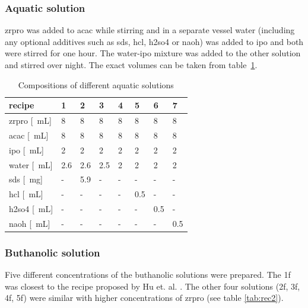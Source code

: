 \documentclass[a4paper]{article}
\newcommand{\td}[1]{\textbf{\textcolor{red}{#1}}}
\newcommand{\me}[1]{\textcolor{gray}{#1}}
\newcommand{\mg}[1]{\SI{#1}{\milli\gram}}
\newcommand{\ml}[1]{\SI{#1}{\milli\liter}}
\begin{document}
\subsubsection{Aquatic solution}
\gls{zrpro} was added to \gls{acac} while stirring and in a separate vessel \gls{water} (including any optional additives such as \gls{sds}, \gls{hcl}, \gls{h2so4} or \gls{naoh}) was added to \gls{ipo} and both were stirred for one hour. 
The \gls{water}-\gls{ipo} mixture was added to the other solution and stirred over night. 
The exact volumes can be taken from table~\ref{tab:rec1}.
\begin{table}[h]
	\centering
	\caption{Compositions of different aquatic solutions}
	\label{tab:rec1}
	\begin{tabular}{llllllll}
		\hline
		recipe				&1		&2		&3		&4		&5		&6		&7\\
		\hline
		\gls{zrpro} [\ml{}]	&8		&8		&8		&8		&8		&8		&8\\
		\gls{acac}  [\ml{}]	&8		&8		&8		&8		&8		&8		&8\\
		\gls{ipo}   [\ml{}]	&2		&2		&2		&2		&2		&2		&2\\
		\gls{water} [\ml{}]	&2.6	&2.6	&2.5	&2~		&2		&2		&2\\
		\gls{sds}   [\mg{}]	&-		&5.9	&-		&-		&-		&-		&-\\
		\gls{hcl}   [\ml{}]	&-		&-		&-		&-		&0.5	&-		&-\\
		\gls{h2so4} [\ml{}]	&-		&-		&-		&-		&-		&0.5	&-\\
		\gls{naoh}  [\ml{}] &-		&-		&-		&-		&-		&-		&0.5\\
		\hline
	\end{tabular}
\end{table}
%
\subsubsection{Buthanolic solution}
\label{sec:sol}
Five different concentrations of the buthanolic solutions were prepared. 
The \gls{1f} 
was closest to the recipe proposed by Hu et. al. \cite{Hu2016}. 
The other four solutions (\gls{2f}, \gls{3f}, \gls{4f}, \gls{5f}) were similar with higher concentrations of \gls{zrpro} (see table \ref{tab:rec2}).
\end{document}
